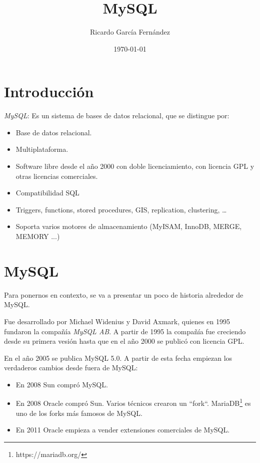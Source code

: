 \documentclass[11pt]{article}
\title{\textbf{MySQL}}
\author{Ricardo Garc\'ia Fern\'andez}
\date{\today}
\begin{document}
\maketitle

\section{Introducci\'on}

\emph{MySQL}: Es un sistema de bases de datos relacional, que se distingue por:

\begin{itemize}
	\item Base de datos relacional.
	\item Multiplataforma.
	\item Software libre desde el año 2000 con doble licenciamiento, con licencia GPL y otras licencias comerciales.
	\item Compatibilidad SQL
	\item Triggers, functions, stored procedures, GIS, replication, clustering, \ldots
    \item Soporta varios motores de almacenamiento (MyISAM, InnoDB, MERGE, MEMORY ...)
\end{itemize}

\section{MySQL}\label{sec:mysql}

\par Para ponernos en contexto, se va a presentar un poco de historia alrededor de MySQL.

\par Fue desarrollado por Michael Widenius y David Axmark, quienes en 1995 fundaron la compa\~n\'ia \emph{MySQL AB}. A partir de 1995 la compañ\'ia fue creciendo desde su primera vesi\'on hasta que en el a\~no 2000 se public\'o con licencia GPL.

\par En el a\~no 2005 se publica MySQL 5.0. A partir de esta fecha empiezan los verdaderos cambios desde fuera de MySQL:

\begin{itemize}
	\item En 2008 Sun compr\'o MySQL.
	\item En 2008 Oracle compr\'o Sun. Varios t\'ecnicos crearon un ``fork``. MariaDB\footnote{https://mariadb.org/} es uno de los forks m\'as famosos de MySQL.    
	\item En 2011 Oracle empieza a vender extensiones comerciales de MySQL.
\end{itemize}
\end{document}

